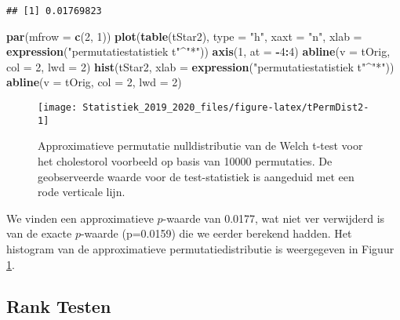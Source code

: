 \documentclass[12pt,dutch,coursenotes]{book}
\newenvironment{Shaded}{\begin{snugshade}}{\end{snugshade}}
\newcommand{\KeywordTok}[1]{\textcolor[rgb]{0.13,0.29,0.53}{\textbf{#1}}}
\newcommand{\DataTypeTok}[1]{\textcolor[rgb]{0.13,0.29,0.53}{#1}}
\newcommand{\DecValTok}[1]{\textcolor[rgb]{0.00,0.00,0.81}{#1}}
\newcommand{\StringTok}[1]{\textcolor[rgb]{0.31,0.60,0.02}{#1}}
\newcommand{\OperatorTok}[1]{\textcolor[rgb]{0.81,0.36,0.00}{\textbf{#1}}}
\newcommand{\NormalTok}[1]{#1}
\theoremstyle{definition}
\theoremstyle{definition}
\theoremstyle{definition}
\theoremstyle{remark}
\begin{document}
\begin{verbatim}
## [1] 0.01769823
\end{verbatim}

\begin{Shaded}
\begin{Highlighting}[]
\KeywordTok{par}\NormalTok{(}\DataTypeTok{mfrow =} \KeywordTok{c}\NormalTok{(}\DecValTok{2}\NormalTok{, }\DecValTok{1}\NormalTok{))}
\KeywordTok{plot}\NormalTok{(}\KeywordTok{table}\NormalTok{(tStar2), }\DataTypeTok{type =} \StringTok{"h"}\NormalTok{, }\DataTypeTok{xaxt =} \StringTok{"n"}\NormalTok{, }\DataTypeTok{xlab =} \KeywordTok{expression}\NormalTok{(}\StringTok{"permutatiestatistiek t"}\OperatorTok{^}\StringTok{"*"}\NormalTok{))}
\KeywordTok{axis}\NormalTok{(}\DecValTok{1}\NormalTok{, }\DataTypeTok{at =} \OperatorTok{-}\DecValTok{4}\OperatorTok{:}\DecValTok{4}\NormalTok{)}
\KeywordTok{abline}\NormalTok{(}\DataTypeTok{v =}\NormalTok{ tOrig, }\DataTypeTok{col =} \DecValTok{2}\NormalTok{, }\DataTypeTok{lwd =} \DecValTok{2}\NormalTok{)}
\KeywordTok{hist}\NormalTok{(tStar2, }\DataTypeTok{xlab =} \KeywordTok{expression}\NormalTok{(}\StringTok{"permutatiestatistiek t"}\OperatorTok{^}\StringTok{"*"}\NormalTok{))}
\KeywordTok{abline}\NormalTok{(}\DataTypeTok{v =}\NormalTok{ tOrig, }\DataTypeTok{col =} \DecValTok{2}\NormalTok{, }\DataTypeTok{lwd =} \DecValTok{2}\NormalTok{)}
\end{Highlighting}
\end{Shaded}

\begin{figure}

{\centering \texttt{[image: Statistiek\_2019\_2020\_files/figure-latex/tPermDist2-1]} 

}

\caption{Approximatieve permutatie nulldistributie van de Welch t-test voor het cholestorol voorbeeld op basis van 10000 permutaties. De geobserveerde waarde voor de test-statistiek is aangeduid met een rode verticale lijn.}\label{fig:tPermDist2}
\end{figure}

We vinden een approximatieve \(p\)-waarde van 0.0177, wat niet ver
verwijderd is van de exacte \(p\)-waarde (p=0.0159) die we eerder
berekend hadden. Het histogram van de approximatieve
permutatiedistributie is weergegeven in Figuur \ref{fig:tPermDist2}.

\subsection{Rank Testen}\label{rank-testen}
\end{document}
